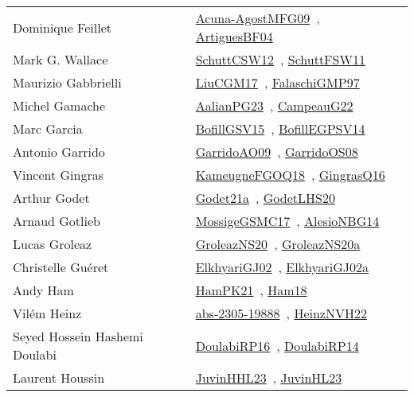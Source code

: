 {\begin{longtable}{p{4cm}p{20cm}}
Dominique Feillet & \href{works/Acuna-AgostMFG09.pdf}{Acuna-AgostMFG09}~\cite{Acuna-AgostMFG09}, \href{works/ArtiguesBF04.pdf}{ArtiguesBF04}~\cite{ArtiguesBF04}\\
Mark G. Wallace & \href{works/SchuttCSW12.pdf}{SchuttCSW12}~\cite{SchuttCSW12}, \href{works/SchuttFSW11.pdf}{SchuttFSW11}~\cite{SchuttFSW11}\\
Maurizio Gabbrielli & \href{works/LiuCGM17.pdf}{LiuCGM17}~\cite{LiuCGM17}, \href{works/FalaschiGMP97.pdf}{FalaschiGMP97}~\cite{FalaschiGMP97}\\
Michel Gamache & \href{works/AalianPG23.pdf}{AalianPG23}~\cite{AalianPG23}, \href{works/CampeauG22.pdf}{CampeauG22}~\cite{CampeauG22}\\
Marc Garcia & \href{works/BofillGSV15.pdf}{BofillGSV15}~\cite{BofillGSV15}, \href{works/BofillEGPSV14.pdf}{BofillEGPSV14}~\cite{BofillEGPSV14}\\
Antonio Garrido & \href{works/GarridoAO09.pdf}{GarridoAO09}~\cite{GarridoAO09}, \href{works/GarridoOS08.pdf}{GarridoOS08}~\cite{GarridoOS08}\\
Vincent Gingras & \href{works/KameugneFGOQ18.pdf}{KameugneFGOQ18}~\cite{KameugneFGOQ18}, \href{works/GingrasQ16.pdf}{GingrasQ16}~\cite{GingrasQ16}\\
Arthur Godet & \href{}{Godet21a}~\cite{Godet21a}, \href{works/GodetLHS20.pdf}{GodetLHS20}~\cite{GodetLHS20}\\
Arnaud Gotlieb & \href{works/MossigeGSMC17.pdf}{MossigeGSMC17}~\cite{MossigeGSMC17}, \href{works/AlesioNBG14.pdf}{AlesioNBG14}~\cite{AlesioNBG14}\\
Lucas Groleaz & \href{works/GroleazNS20.pdf}{GroleazNS20}~\cite{GroleazNS20}, \href{works/GroleazNS20a.pdf}{GroleazNS20a}~\cite{GroleazNS20a}\\
Christelle Gu{\'{e}}ret & \href{works/ElkhyariGJ02.pdf}{ElkhyariGJ02}~\cite{ElkhyariGJ02}, \href{works/ElkhyariGJ02a.pdf}{ElkhyariGJ02a}~\cite{ElkhyariGJ02a}\\
Andy Ham & \href{works/HamPK21.pdf}{HamPK21}~\cite{HamPK21}, \href{works/Ham18.pdf}{Ham18}~\cite{Ham18}\\
Vil{\'{e}}m Heinz & \href{works/abs-2305-19888.pdf}{abs-2305-19888}~\cite{abs-2305-19888}, \href{works/HeinzNVH22.pdf}{HeinzNVH22}~\cite{HeinzNVH22}\\
Seyed Hossein Hashemi Doulabi & \href{}{DoulabiRP16}~\cite{DoulabiRP16}, \href{works/DoulabiRP14.pdf}{DoulabiRP14}~\cite{DoulabiRP14}\\
Laurent Houssin & \href{works/JuvinHHL23.pdf}{JuvinHHL23}~\cite{JuvinHHL23}, \href{works/JuvinHL23.pdf}{JuvinHL23}~\cite{JuvinHL23}\\

\end{longtable}}
